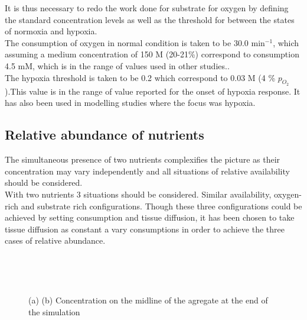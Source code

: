 \documentclass[11pt,a4paper]{article}
\begin{document}
It is thus necessary to redo the work done for substrate for oxygen by defining the standard concentration levels as well as the threshold for between the states of normoxia and hypoxia.\\

The consumption of oxygen in normal condition is taken to be 30.0 min$^{-1}$, which assuming a medium concentration of 150 \textmu M (20-21\%) correspond to consumption 4.5 mM, which is in the range of values used in other studies.\cite{Kempf2005}\cite{Mao2018}. \\

The hypoxia threshold is taken to be 0.2 which correspond to 0.03 \textmu M (4 \% $p_{O_{2}}$).This value is in the range of value reported for the onset of hypoxia response.\cite{McKeown2014}\cite{Saxena2019} It has also been used in modelling studies where the focus was hypoxia.\cite{Bull2020}\cite{Kempf2015}

\subsection{Relative abundance of nutrients}
The simultaneous presence of two nutrients complexifies the picture as their concentration may vary independently and all situations of relative availability should be considered.\\

With two nutrients 3 situations should be considered. Similar availability, oxygen-rich and substrate rich configurations. Though these three configurations could be achieved by setting consumption and tissue diffusion, it has been chosen to take tissue diffusion as constant a vary consumptions in order to achieve the  three cases of relative abundance.\\

\begin{figure}[ht!]
\begin{subfigure}{0.32\textwidth}
	\centering
	
	\caption{ \label{ref_mid_Id}}
\end{subfigure}
~
\begin{subfigure}{0.32\textwidth}
	\centering
	
	\caption{\label{ref_mid_Gl}}
\end{subfigure}
~
\begin{subfigure}{0.32\textwidth}
	\centering
	
	\caption{\label{ref_mid_Ox}}
\end{subfigure}
\caption{(a)  (b) Concentration on the midline of the agregate at the end of the simulation \label{ref_mid}}
\end{figure}
\end{document}
